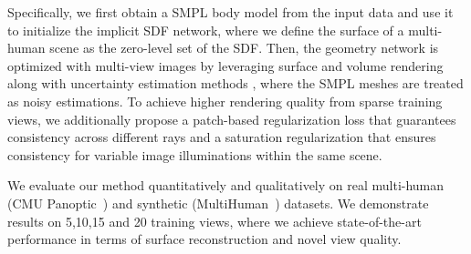 Specifically, we first obtain a SMPL body model from the input data and use it to initialize the implicit SDF network, where we define the surface of a multi-human scene as the zero-level set of the SDF. 
Then, the geometry network is optimized with multi-view images by leveraging surface and volume rendering ~\cite{wang2021neus} along with uncertainty estimation methods \cite{deng2022depth,roessle2022dense}, where the SMPL meshes are treated as noisy estimations.  
To achieve higher rendering quality from sparse training views, we additionally propose a patch-based regularization loss that guarantees consistency across different rays and a saturation regularization that ensures consistency for variable image illuminations within the same scene.%

We evaluate our method quantitatively and qualitatively on real multi-human (CMU Panoptic~\cite{Simon_2017_CVPR,Joo_2017_TPAMI}) and synthetic (MultiHuman~\cite{zheng2021deepmulticap}) datasets. We demonstrate results on 5,10,15 and 20 training views, where we achieve state-of-the-art performance in terms of surface reconstruction and novel view quality. 



